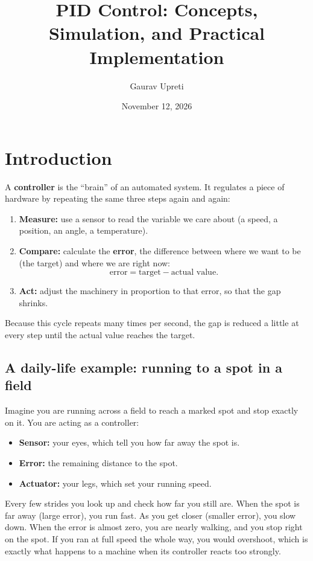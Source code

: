 \documentclass[10pt]{article}
\title{PID Control: Concepts, Simulation, and Practical Implementation}
\author{Gaurav Upreti}
\date{November 12, 2026}
\begin{document}
	
	\maketitle
	
	\section{Introduction}
	A \textbf{controller} is the ``brain'' of an automated system. It regulates a piece of hardware by repeating the same three steps again and again:
	\begin{enumerate}
		\item \textbf{Measure:} use a sensor to read the variable we care about (a speed, a position, an angle, a temperature).
		\item \textbf{Compare:} calculate the \textbf{error}, the difference between where we want to be (the target) and where we are right now:
		\begin{equation}
			\text{error} = \text{target} - \text{actual value}.
		\end{equation}
		\item \textbf{Act:} adjust the machinery in proportion to that error, so that the gap shrinks.
	\end{enumerate}
	Because this cycle repeats many times per second, the gap is reduced a little at every step until the actual value reaches the target.
	
	\subsection{A daily-life example: running to a spot in a field}
	Imagine you are running across a field to reach a marked spot and stop exactly on it. You are acting as a controller:
	\begin{itemize}
		\item \textbf{Sensor:} your eyes, which tell you how far away the spot is.
		\item \textbf{Error:} the remaining distance to the spot.
		\item \textbf{Actuator:} your legs, which set your running speed.
	\end{itemize}
	Every few strides you look up and check how far you still are. When the spot is far away (large error), you run fast. As you get closer (smaller error), you slow down. When the error is almost zero, you are nearly walking, and you stop right on the spot. If you ran at full speed the whole way, you would overshoot, which is exactly what happens to a machine when its controller reacts too strongly.
	
\end{document}
